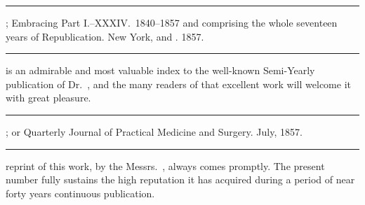 \fancybreak{* * *}
\footnotesize
{}; Embracing Part I.--XXXIV.\ 1840--1857
and comprising the whole seventeen years of Republication. New York,  and
. 1857.
\plainbreak{1}
\normalsize

 is an admirable and most valuable index to the well-known
Semi-Yearly publication of Dr.\ , and the many readers of
that excellent work will welcome it with great pleasure.

\fancybreak{* * *}
\footnotesize
{}; or Quarterly Journal of Practical
Medicine and Surgery. July, 1857.
\plainbreak{1}
\normalsize

 reprint of this work, by the Messrs.\ , always comes
promptly. The present number fully sustains the high reputation it
has acquired during a period of near forty years continuous publication.\endinput
